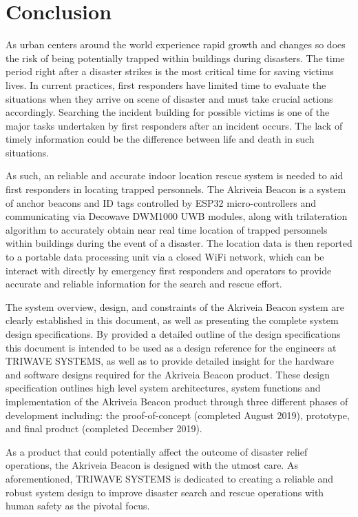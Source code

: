

\setcounter{section}{6}
\section{Conclusion}

\bigskip
As urban centers around the world experience rapid growth and changes so does the risk of being potentially trapped within buildings during disasters. The time period right after a disaster strikes is the most critical time for saving victims lives. In current practices, first responders have limited time to evaluate the situations when they arrive on scene of disaster and must take crucial actions accordingly. Searching the incident building for possible victims is one of the major tasks undertaken by first responders after an incident occurs. The lack of timely information could be the difference between life and death in such situations.

\bigskip
As such, an reliable and accurate indoor location rescue system is needed to aid first responders in locating trapped personnels. The Akriveia Beacon is a system of anchor beacons and ID tags controlled by ESP32 micro-controllers and communicating via Decowave DWM1000 UWB modules, along with trilateration algorithm to accurately obtain near real time location of trapped personnels within buildings during the event of a disaster. The location data is then reported to a portable data processing unit via a closed WiFi network, which can be interact with directly by emergency first responders and operators to provide accurate and reliable information for the search and rescue effort. 

\bigskip
The system overview, design, and constraints of the Akriveia Beacon system are clearly established in this document, as well as presenting the complete system design specifications. By provided a detailed outline of the design specifications this document is intended to be used as a design reference for the engineers at TRIWAVE SYSTEMS, as well as to provide detailed insight for the hardware and software designs required for the Akriveia Beacon product. These design specification outlines high level system architectures, system functions and implementation of the Akriveia Beacon product through three different phases of development including: the proof-of-concept (completed August 2019), prototype, and final product (completed December 2019).

\bigskip
As a product that could potentially affect the outcome of disaster relief operations, the Akriveia Beacon is designed with the utmost care. As aforementioned, TRIWAVE SYSTEMS is dedicated to creating a reliable and robust system design to improve disaster search and rescue operations with human safety as the pivotal focus.
